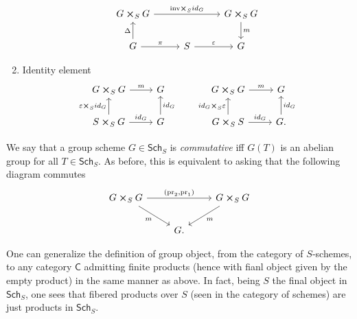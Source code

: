 \documentclass[../Main]{subfiles}
\begin{document}
\begin{rem}[]
\begin{enumerate}
\begin{equation*}
			\begin{tikzcd}[column sep=2.7em]
				G \cross_{ S } G \arrow[rr, "\mathrm{inv} \cross_S id_G", rightarrow] & &
				G \cross_{ S } G \arrow[d, "m", rightarrow] \\
				G \arrow[u, "\Delta", rightarrow] 
				\arrow[r, "\pi", rightarrow] &
				S \arrow[r, "\varepsilon", rightarrow] & 
				G
			\end{tikzcd}
			\end{equation*} 
		\item Identity element 
			\begin{equation*}
			\begin{tikzcd}
				G \cross_{ S } G \arrow[r, "m", rightarrow] &
				G \\
				S \cross_{ S } G \arrow[r, "id_G", rightarrow] 
				\arrow[u, "\varepsilon \cross_S id_G", rightarrow] &
				G \arrow[u, "id_G"', rightarrow] 
			\end{tikzcd}
			\qquad
			\begin{tikzcd}
				G \cross_{ S } G \arrow[r, "m", rightarrow] &
				G \\
				G \cross_{ S } S \arrow[r, "id_G", rightarrow] 
				\arrow[u, "id_G \cross_S \varepsilon", rightarrow] &
				G. \arrow[u, "id_G"', rightarrow] 
			\end{tikzcd}
			\end{equation*} 
	\end{enumerate}
\end{rem}


\begin{defn}
	We say that a group scheme $G \in \mathsf{Sch}_{ S }$ is {\em commutative}
	iff $G(T)$ is an abelian group for all $T \in \mathsf{Sch}_{ S }$.
	As before, this is equivalent to asking that the following diagram commutes
	\begin{equation*}
	\begin{tikzcd}
		G \cross_S G \arrow[rr, "{ \left(\mathrm{pr}_2, \mathrm{pr}_1\right)}", rightarrow] 
		\arrow[rd, "m"', rightarrow] & &
		G \cross_{ S } G
		\arrow[ld, "m", rightarrow] \\
					     &
		G
	.\end{tikzcd}
	\end{equation*}
\end{defn}


\begin{rem}[]
	One can generalize the definition of group object, from the category
	of $S$-schemes, to any category $\mathsf{C}$ admitting finite products
	(hence with fianl object given by the empty product) in the same manner as above.
	In fact, being $S$ the final object in $\mathsf{Sch}_{ S }$, one sees
	that fibered products over $S$ (seen in the category of schemes)
	are just products in $\mathsf{Sch}_{ S }$.
\end{rem}
\end{document}

